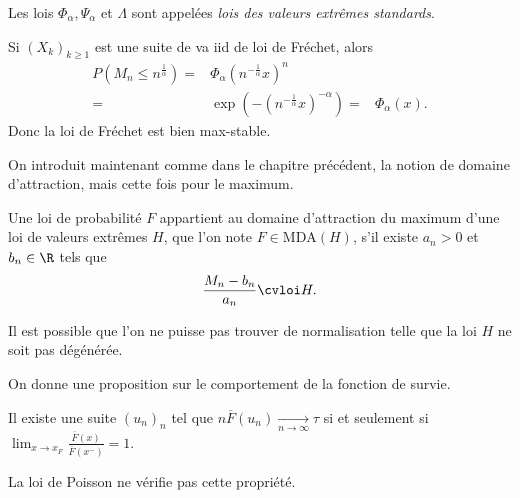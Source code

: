 \documentclass[10p,a4paper,reqno,titlepage]{report}
\begin{document}
\begin{rem}
	Les lois $\Phi_\alpha, \Psi_\alpha$ et $\Lambda$ sont appelées \textit{lois des valeurs extrêmes standards}.
\end{rem}
\begin{rem}
	Si $(X_k)_{k \geq 1}$ est une suite de va iid de loi de Fréchet, alors 
	\begin{align*}
		P(M_n \leq n ^{\tfrac{1}{\alpha}}) = & \Phi_\alpha (n^{-\tfrac{1}{\alpha}} x)^n \\
		= & \exp(- (n^{-\tfrac{1}{\alpha}} x)^{-\alpha})
		= & \Phi_\alpha(x).
	\end{align*}
Donc la loi de Fréchet est bien max-stable.
\end{rem}
On introduit maintenant comme dans le chapitre précédent, la notion de domaine d'attraction, mais cette fois pour le maximum.
\begin{de}
	Une loi de probabilité $F$ appartient au domaine d'attraction du maximum d'une loi de valeurs extrêmes $H$, que l'on note $ F \in \mathrm{MDA} (H)$, s'il existe $a_n >0$ et $b_n \in \R$ tels que 
	$$ \frac{M_n -b_n}{a_n} \cvloi H .$$
\end{de}
\begin{rem}
	Il est possible que l'on ne puisse pas trouver de normalisation telle que la loi $H$ ne soit pas dégénérée.
\end{rem}
On donne une proposition sur le comportement de la fonction de survie.
\begin{prop}\label{LLR}
	Il existe une suite $(u_n)_n$ tel que $ n \overline{F}(u_n) \underset{n\to \infty}{\longrightarrow} \tau$ si et seulement si $ \lim_{x \to x_F} \frac{\overline{F}(x)}{\overline{F}(x^- )}=1.$
\end{prop}
\begin{rem}
	La loi de Poisson ne vérifie pas cette propriété.
\end{rem}
\end{document}
